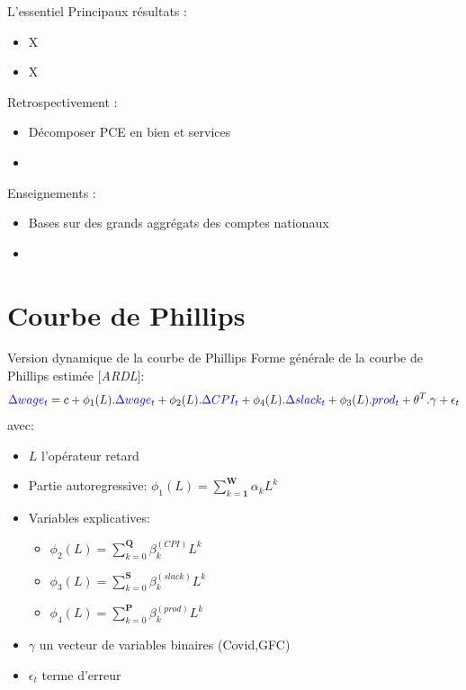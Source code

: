 \documentclass[9pt, xcolor={dvipsnames}]{beamer}
\newcommand{\blue}[1]{\textcolor{blue}{#1}}
\begin{document}
\begin{frame}{L'essentiel}
  Principaux résultats :
  \begin{itemize}
    \item X
    \item X
  \end{itemize}
  \vspace{.2cm}
  Retrospectivement :
  \begin{itemize}
    \item Décomposer PCE en bien et services
    \item 
  \end{itemize}
  \vspace{.2cm}
  Enseignements :
  \begin{itemize}
    \item Bases sur des grands aggrégats des comptes nationaux
    \item 
  \end{itemize}
\end{frame}

\section{Courbe de Phillips}
\begin{frame}[label=model]{Version dynamique de la courbe de Phillips}
  Forme générale de la courbe de Phillips estimée [\textit{ARDL}]:
  \begin{equation*}
    \blue{\Delta wage_{t}} = c + \phi_{1}(L).\blue{\Delta wage_{t}} + \phi_{2}(L).\blue{\Delta CPI_{t}} + \phi_{4}(L).\blue{\Delta slack_{t}} + \phi_{3}(L).\blue{prod_{t}} + \theta^{T}.\gamma + \epsilon_{t}
  \end{equation*}
  avec:
  \begin{itemize}
    \item $L$ l'opérateur retard
    \item Partie autoregressive: $\phi_{1}(L) = \sum_{k=\mathbf{1}}^{\mathbf{W}}\alpha_k L^{k}$ 
    \item Variables explicatives:
    \begin{itemize}
      \item $\phi_{2}(L) = \sum_{k=0}^{\mathbf{Q}}\beta_k^{(CPI)} L^{k}$
      \item $\phi_{3}(L) = \sum_{k=0}^{\mathbf{S}}\beta_k^{(slack)} L^{k}$
      \item $\phi_{4}(L) = \sum_{k=0}^{\mathbf{P}}\beta_k^{(prod)} L^{k}$
    \end{itemize}
    \item $\gamma$ un vecteur de variables binaires (Covid,GFC)
    \item $\epsilon_{t}$ terme d'erreur
  \end{itemize}
\end{frame}
\end{document}
